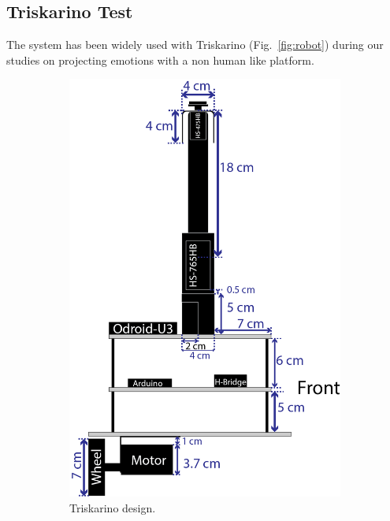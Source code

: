 \subsection{Triskarino Test}
The system has been widely used with Triskarino (Fig.~\ref{fig:robot}) during our studies on projecting emotions with a non human like platform. 
\begin{figure}
	\centering
	\begin{subfigure}[c]{0.2\textwidth}
	\includegraphics[width=\textwidth]{./Images/upperFourthD.png}
	\caption{Triskarino design.}
	\label{fig:design}
	\end{subfigure}
	\begin{subfigure}[c]{0.2\textwidth}

\end{subfigure}
\end{figure}
